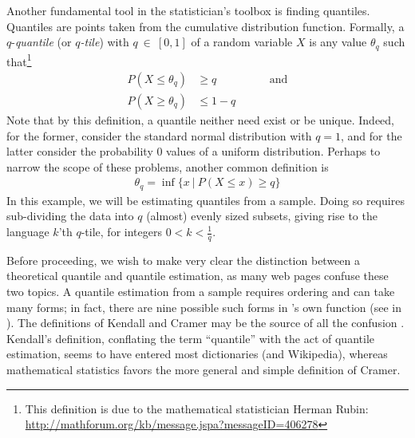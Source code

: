 Another fundamental tool in the statistician's toolbox is finding quantiles.
Quantiles are points taken from the cumulative distribution function.
Formally, a $q$-\emph{quantile} (or \emph{$q$-tile}) with $q~\in~[0,1]$ of
a random variable $X$ is any value $\theta_q$ such
that\footnote{This definition is due to the mathematical statistician Herman
Rubin: \url{http://mathforum.org/kb/message.jspa?messageID=406278}}
\begin{align*}
P(X\leq \theta_q) &\geq q\hspace{2cm}\text{and}\\
P(X\geq \theta_q) &\leq 1-q
\end{align*}
Note that by this definition, a quantile neither need exist or be unique.
Indeed, for the former, consider the standard normal distribution with
$q=1$, and for the latter consider the probability 0 values of a uniform
distribution. Perhaps to narrow the scope of these problems, another
common definition is
\begin{align*}
\theta_q = \inf \{x\ |\ P(X\leq x) \geq q\}
\end{align*}
In this example, we will be estimating quantiles from a sample.
Doing so requires sub-dividing the data into $q$ (almost) evenly
sized subsets, giving rise to the language $k$'th $q$-tile, for
integers $0<k<\frac{1}{q}$.

Before proceeding, we wish to make very clear the distinction between a
theoretical quantile and quantile estimation, as many web pages confuse
these two topics.  A quantile estimation from a sample requires ordering
and can take many forms; in fact, there are nine possible such forms
in 's own 
function (see 
in ). The definitions of Kendall and Cramer may be the source
of all the confusion \citep{quantilemess}. Kendall's definition, conflating
the term ``quantile'' with the act of quantile estimation, seems to have
entered most dictionaries (and Wikipedia), whereas mathematical statistics
favors the more general and simple definition of Cramer.

